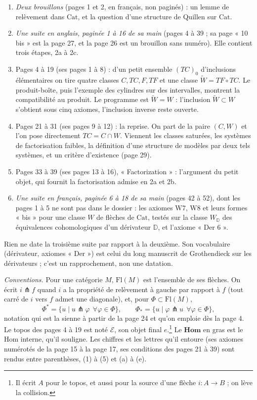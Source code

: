 \documentclass[11pt,a4paper]{article}
\begin{document}
\begin{enumerate}
\item[1.] \emph{Deux brouillons} (pages 1 et 2, en français, non paginés) : un
lemme de relèvement dans $\mathrm{Cat}$, et la question d'une structure de
Quillen sur $\mathrm{Cat}$.
\item[2.] \emph{Une suite en anglais, paginée 1 à 16 de sa main} (pages 4 à
39 ; sa page « 10 bis » est la page 27, et la page 26 est un brouillon sans
numéro). Elle contient trois étapes, 2a à 2c.
\item[2a.] Pages 4 à 19 (ses pages 1 à 8) : d'un petit ensemble $(TC)_0$
d'inclusions élémentaires on tire quatre classes $C, TC, F, TF$ et une classe
$\widetilde W = TF \circ TC$. Le produit-boîte, puis l'exemple des cylindres
sur des intervalles, montrent la compatibilité au produit. Le programme est
$\widetilde W = W$ : l'inclusion $\widetilde W \subset W$ s'obtient sous cinq
axiomes, l'inclusion inverse reste ouverte.
\item[2b.] Pages 21 à 31 (ses pages 9 à 12) : la reprise. On part de la paire
$(C, W)$ et l'on pose directement $TC = C \cap W$. Viennent les classes
saturées, les systèmes de factorisation faibles, la définition d'une structure
de modèles par deux tels systèmes, et un critère d'existence (page 29).
\item[2c.] Pages 33 à 39 (ses pages 13 à 16), « Factorization » : l'argument
du petit objet, qui fournit la factorisation admise en 2a et 2b.
\item[3.] \emph{Une suite en français, paginée 6 à 18 de sa main} (pages 42 à
52), dont les pages 1 à 5 ne sont pas dans le dossier : les axiomes W7, W8 et
leurs formes « bis » pour une classe $W$ de flèches de $\mathrm{Cat}$, testés
sur la classe $W_{\mathbb D}$ des équivalences cohomologiques d'un dérivateur
$\mathbb D$, et l'axiome « Der 6 ».
\end{enumerate}

Rien ne date la troisième suite par rapport à la deuxième. Son vocabulaire
(dérivateur, axiomes « Der ») est celui du long manuscrit de Grothendieck sur
les dérivateurs ; c'est un rapprochement, non une datation.

\emph{Conventions.} Pour une catégorie $M$, $\mathrm{Fl}(M)$ est l'ensemble de
ses flèches. On écrit $i \pitchfork f$ quand $i$ a la propriété de relèvement à
gauche par rapport à $f$ (tout carré de $i$ vers $f$ admet une diagonale), et,
pour $\Phi \subset \mathrm{Fl}(M)$,
\[
\Phi^* = \{u \mid u \pitchfork \varphi \ \ \forall \varphi \in \Phi\}, \qquad
\Phi_* = \{u \mid \varphi \pitchfork u \ \ \forall \varphi \in \Phi\},
\]
notation qui est la sienne à partir de la page 24 et qu'on emploie dès la page
4. Le topos des pages 4 à 19 est noté $\mathcal{E}$, son objet final
$e$.\footnote{Il écrit $A$ pour le topos, et aussi pour la source d'une
flèche $i : A \to B$ ; on lève la collision.} Le $\mathbf{Hom}$ en gras est le
$\mathrm{Hom}$ interne, qu'il souligne. Les chiffres et les lettres qu'il entoure (ses axiomes
numérotés de la page 15 à la page 17, ses conditions des pages 21 à 39) sont
rendus entre parenthèses, (1) à (5) et (a) à (e).
\end{document}
